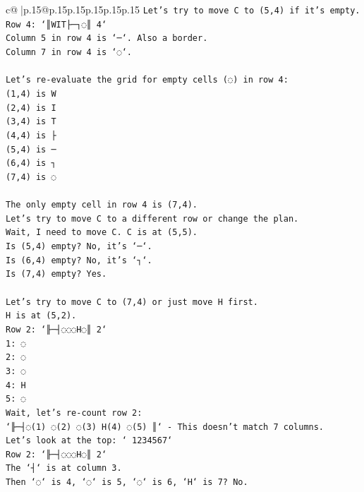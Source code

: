 \documentclass{article}
\begin{document}
{\begin{supertabular}{c@{$\;$}|p{.15\linewidth}@{}p{.15\linewidth}p{.15\linewidth}p{.15\linewidth}p{.15\linewidth}p{.15\linewidth}}
{{{\texttt{Let's try to move C to (5,4) if it's empty.} \\
\texttt{Row 4: `║WIT├─┐◌║ 4`} \\
\texttt{Column 5 in row 4 is `─`. Also a border.} \\
\texttt{Column 7 in row 4 is `◌`.} \\
\\ 
\texttt{Let's re{-}evaluate the grid for empty cells (◌) in row 4:} \\
\texttt{(1,4) is W} \\
\texttt{(2,4) is I} \\
\texttt{(3,4) is T} \\
\texttt{(4,4) is ├} \\
\texttt{(5,4) is ─} \\
\texttt{(6,4) is ┐} \\
\texttt{(7,4) is ◌} \\
\\ 
\texttt{The only empty cell in row 4 is (7,4).} \\
\texttt{Let's try to move C to a different row or change the plan.} \\
\texttt{Wait, I need to move C. C is at (5,5).} \\
\texttt{Is (5,4) empty? No, it's `─`.} \\
\texttt{Is (6,4) empty? No, it's `┐`.} \\
\texttt{Is (7,4) empty? Yes.} \\
\\ 
\texttt{Let's try to move C to (7,4) or just move H first.} \\
\texttt{H is at (5,2).} \\
\texttt{Row 2: `╟─┤◌◌◌H◌║ 2`} \\
\texttt{1: ◌} \\
\texttt{2: ◌} \\
\texttt{3: ◌} \\
\texttt{4: H} \\
\texttt{5: ◌} \\
\texttt{Wait, let's re{-}count row 2:} \\
\texttt{`╟─┤◌(1) ◌(2) ◌(3) H(4) ◌(5) ║` {-} This doesn't match 7 columns.} \\
\texttt{Let's look at the top: ` 1234567`} \\
\texttt{Row 2: `╟─┤◌◌◌H◌║ 2`} \\
\texttt{The `┤` is at column 3.} \\
\texttt{Then `◌` is 4, `◌` is 5, `◌` is 6, `H` is 7? No.} \\
}}}
\end{supertabular}}
\end{document}
